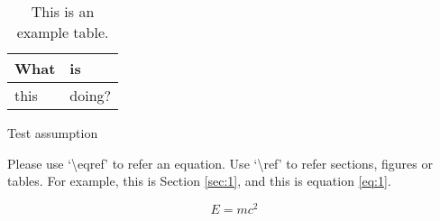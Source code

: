 \documentclass{ncs-thesis}
\begin{document}
\begingroup
\begin{table}
    \centering
    \caption{This is an example table.}\label{tbl:nicetablelesstable}
    \begin{tabular}{ll}
        What & is     \\
        \hline
        this & doing? \\
    \end{tabular}
\end{table}
\endgroup

\begin{assumption}
    Test assumption
\end{assumption}

Please use `\textbackslash eqref' to refer an equation. Use `\textbackslash ref' to refer sections, figures or tables. For example, this is Section \ref{sec:1}, and this is equation \eqref{eq:1}.

\begin{equation}
    E = mc^2
    \label{eq:1}
\end{equation}


\mainmatter





\printbibliography



\end{document}
